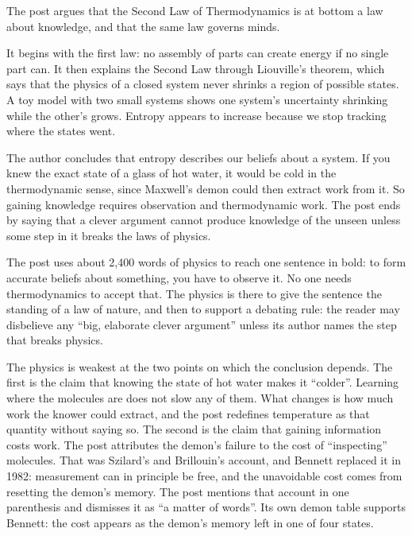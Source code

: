 \begin{afterword}
\summaryhead

The post argues that the Second Law of Thermodynamics is at bottom a law about knowledge, and that the same law governs minds.

It begins with the first law: no assembly of parts can create energy if no single part can. It then explains the Second Law through Liouville's theorem, which says that the physics of a closed system never shrinks a region of possible states. A toy model with two small systems shows one system's uncertainty shrinking while the other's grows. Entropy appears to increase because we stop tracking where the states went.

The author concludes that entropy describes our beliefs about a system. If you knew the exact state of a glass of hot water, it would be cold in the thermodynamic sense, since Maxwell's demon could then extract work from it. So gaining knowledge requires observation and thermodynamic work. The post ends by saying that a clever argument cannot produce knowledge of the unseen unless some step in it breaks the laws of physics.

\responsehead

The post uses about 2,400 words of physics to reach one sentence in bold: to form accurate beliefs about something, you have to observe it. No one needs thermodynamics to accept that. The physics is there to give the sentence the standing of a law of nature, and then to support a debating rule: the reader may disbelieve any ``big, elaborate clever argument'' unless its author names the step that breaks physics.

The physics is weakest at the two points on which the conclusion depends. The first is the claim that knowing the state of hot water makes it ``colder''. Learning where the molecules are does not slow any of them. What changes is how much work the knower could extract, and the post redefines temperature as that quantity without saying so. The second is the claim that gaining information costs work. The post attributes the demon's failure to the cost of ``inspecting'' molecules. That was Szilard's and Brillouin's account, and Bennett replaced it in 1982: measurement can in principle be free, and the unavoidable cost comes from resetting the demon's memory. The post mentions that account in one parenthesis and dismisses it as ``a matter of words''. Its own demon table supports Bennett: the cost appears as the demon's memory left in one of four states.


\end{afterword}
